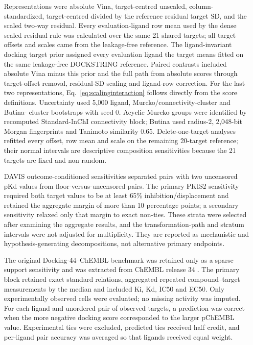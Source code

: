 \documentclass[11pt]{article}
\begin{document}
Representations were absolute Vina, target-centred unscaled, column-standardized,
target-centred divided by the reference residual target SD, and the scaled two-way residual.
Every evaluation-ligand row mean used by the dense scaled residual rule was calculated over
the same 21 shared targets; all target offsets and scales came from the leakage-free reference.
The ligand-invariant docking target prior assigned every evaluation ligand the target means
fitted on the same leakage-free DOCKSTRING reference. Paired contrasts included absolute
Vina minus this prior and the full path from absolute scores through target-offset removal,
residual-SD scaling and ligand-row correction.
For the last two representations, Eq.~\ref{eq:scalinginteraction} follows directly from the
score definitions. Uncertainty used 5,000 ligand, Murcko/connectivity-cluster and Butina-
cluster bootstraps with seed 0. Acyclic Murcko groups were identified by recomputed
Standard-InChI connectivity block; Butina used radius-2, 2,048-bit Morgan fingerprints and
Tanimoto similarity 0.65. Delete-one-target analyses refitted every offset, row mean and scale
on the remaining 20-target reference; their normal intervals are descriptive composition
sensitivities because the 21 targets are fixed and non-random.

DAVIS outcome-conditioned sensitivities separated pairs with two uncensored pKd values from
floor-versus-uncensored pairs. The primary PKIS2 sensitivity required both target values to be at
least 65\% inhibition/displacement and retained the aggregate margin of more than 10
percentage points; a secondary sensitivity relaxed only that margin to exact non-ties.
These strata were selected after examining the aggregate
results, and the transformation-path and stratum intervals were not adjusted for
multiplicity. They are reported as mechanistic and hypothesis-generating decompositions,
not alternative primary endpoints.

The original Docking-44--ChEMBL benchmark was retained only as a sparse support sensitivity
and was extracted from ChEMBL release 34
\cite{zdrazil2024,chembl34}. The primary block retained exact standard relations, aggregated
repeated compound--target measurements by the median and included Ki, Kd, IC50 and EC50.
Only experimentally observed cells were evaluated; no missing activity was imputed. For
each ligand and unordered pair of observed targets, a prediction was correct when the more
negative docking score corresponded to the larger pChEMBL value. Experimental ties were
excluded, predicted ties received half credit, and per-ligand pair accuracy was averaged so
that ligands received equal weight.
\end{document}
